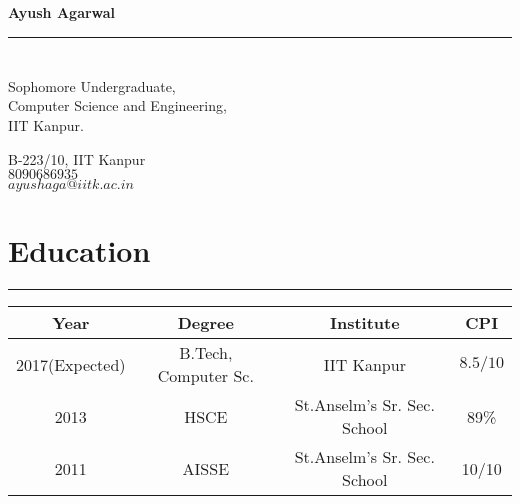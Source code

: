 \documentclass[a4paper]{article}
\author{Ayush Agarwal}
\begin{document}
\begin{center}
 \huge\textbf{Ayush Agarwal}\\
\end{center}
\hrule
\section*{}
\begin{minipage}{.45\linewidth}
\begin{flushleft}
 Sophomore Undergraduate,\\
 Computer Science and Engineering,\\
 IIT Kanpur.
 \end{flushleft}
 \end{minipage}
 \hfill
 \begin{minipage}{.45\linewidth}
 \begin{flushright}
 B-223/10, IIT Kanpur\\
 $8090686935$\\
 $ayushaga@iitk.ac.in$\\
 \end{flushright}
 \end{minipage}
 \section*{Education}
 \hrule
 \begin{center}
 \vspace{3mm}
  \begin{tabular}{|c|c|c|c|}
  \hline
  Year & Degree & Institute & CPI\\
  \hline
  2017(Expected)& B.Tech, Computer Sc.&IIT Kanpur&$8.5/10$\\
  \hline
  2013& HSCE&St.Anselm's Sr. Sec. School&89\% \\
  \hline
  2011& AISSE&St.Anselm's Sr. Sec. School&10/10 \\
  \hline
  \end{tabular}
 \end{center} 
  
\end{document}
